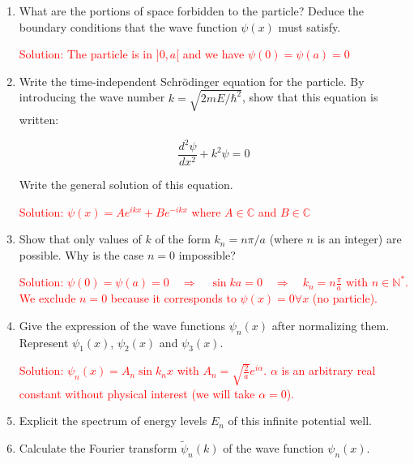 \documentclass{article}
\begin{document}
\begin{enumerate}
    \item What are the portions of space forbidden to the particle? Deduce the boundary conditions that the wave function $\psi(x)$ must satisfy.

    \textcolor{red}{Solution: The particle is in $]0, a[$ and we have $\psi(0) = \psi(a) = 0$}

    \item Write the time-independent Schrödinger equation for the particle. By introducing the wave number $k = \sqrt{2 m E / \hbar^{2}}$, show that this equation is written:

    $$
    \frac{d^{2} \psi}{d x^{2}} + k^{2} \psi = 0
    $$

    Write the general solution of this equation.

    \textcolor{red}{Solution: $\psi(x) = A e^{i k x} + B e^{-i k x}$ where $A \in \mathbb{C}$ and $B \in \mathbb{C}$}

    \item Show that only values of $k$ of the form $k_{n} = n \pi / a$ (where $n$ is an integer) are possible. Why is the case $n=0$ impossible?

    \textcolor{red}{Solution: $\psi(0) = \psi(a) = 0 \quad \Rightarrow \quad \sin k a = 0 \quad \Rightarrow \quad k_{n} = n \frac{\pi}{a}$ with $n \in \mathbb{N}^{*}$. We exclude $n=0$ because it corresponds to $\psi(x) = 0 \forall x$ (no particle).}

    \item Give the expression of the wave functions $\psi_{n}(x)$ after normalizing them. Represent $\psi_{1}(x)$, $\psi_{2}(x)$ and $\psi_{3}(x)$.

    \textcolor{red}{Solution: $\psi_{n}(x) = A_{n} \sin k_{n} x$ with $A_{n} = \sqrt{\frac{2}{a}} e^{i \alpha}$. $\alpha$ is an arbitrary real constant without physical interest (we will take $\alpha = 0$).}

    \item Explicit the spectrum of energy levels $E_{n}$ of this infinite potential well.

    {}

    \item Calculate the Fourier transform $\tilde{\psi}_{n}(k)$ of the wave function $\psi_{n}(x)$.

    {}
\end{enumerate}
\end{document}

